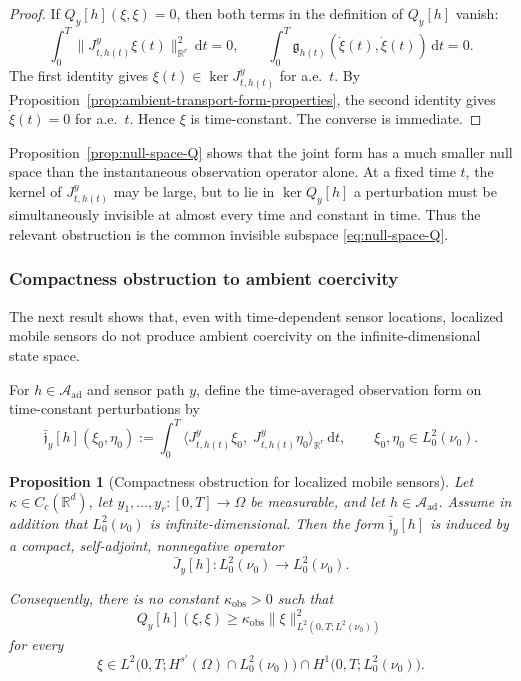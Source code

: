\documentclass{article}
\newtheorem{proposition}[theorem]{Proposition}
\theoremstyle{definition}
\renewcommand{\d}{\mathrm{d}}
\begin{document}
\begin{proof}
    If \(Q_y[h](\xi,\xi)=0\), then both terms in the definition of \(Q_y[h]\) vanish:
    \[
        \int_0^T \|J_{t,h(t)}^{y}\xi(t)\|_{\mathbb R^r}^2\,\d t=0,
        \qquad
        \int_0^T \mathfrak g_{h(t)}(\dot\xi(t),\dot\xi(t))\,\d t=0.
    \]
    The first identity gives \(\xi(t)\in\ker J_{t,h(t)}^{y}\) for a.e.\ \(t\). By
    Proposition~\ref{prop:ambient-transport-form-properties}, the second identity gives
    \(\dot\xi(t)=0\) for a.e.\ \(t\). Hence \(\xi\) is time-constant. The converse is immediate.
\end{proof}

Proposition~\ref{prop:null-space-Q} shows that the joint form has a much smaller null space than
the instantaneous observation operator alone. At a fixed time \(t\), the kernel of
\(J_{t,h(t)}^{y}\) may be large, but to lie in \(\ker Q_y[h]\) a perturbation must be
simultaneously invisible at almost every time and constant in time. Thus the relevant obstruction
is the common invisible subspace \eqref{eq:null-space-Q}.

\subsubsection{Compactness obstruction to ambient coercivity}

The next result shows that, even with time-dependent sensor locations, localized mobile sensors do
not produce ambient coercivity on the infinite-dimensional state space.

For \(h\in\mathcal A_{\mathrm{ad}}\) and sensor path \(y\), define the time-averaged observation
form on time-constant perturbations by
\begin{equation}
    \label{eq:time-averaged-observation-form}
    \bar{\mathfrak j}_y[h](\xi_0,\eta_0)
    :=
    \int_0^T
    \bigl\langle J_{t,h(t)}^{y}\xi_0,\;J_{t,h(t)}^{y}\eta_0\bigr\rangle_{\mathbb R^r}\,\d t,
    \qquad
    \xi_0,\eta_0\in L^2_0(\nu_0).
\end{equation}

\begin{proposition}[Compactness obstruction for localized mobile sensors]
    \label{prop:compactness-obstruction}
    Let \(\kappa\in C_c(\mathbb R^d)\), let \(y_1,\dots,y_r:[0,T]\to\Omega\) be measurable, and let
    \(h\in\mathcal A_{\mathrm{ad}}\). Assume in addition that \(L^2_0(\nu_0)\) is
    infinite-dimensional. Then the form \(\bar{\mathfrak j}_y[h]\) is induced by a compact,
    self-adjoint, nonnegative operator
    \[
        \bar J_y[h]:L^2_0(\nu_0)\to L^2_0(\nu_0).
    \]

    Consequently, there is no constant \(\kappa_{\mathrm{obs}}>0\) such that
    \[
        Q_y[h](\xi,\xi)
        \ge
        \kappa_{\mathrm{obs}}
        \|\xi\|_{L^2(0,T;L^2(\nu_0))}^2
    \]
    for every
    \[
        \xi\in
        L^2\bigl(0,T;H^{s'}(\Omega)\cap L^2_0(\nu_0)\bigr)
        \cap
        H^1\bigl(0,T;L^2_0(\nu_0)\bigr).
    \]
\end{proposition}
\end{document}
